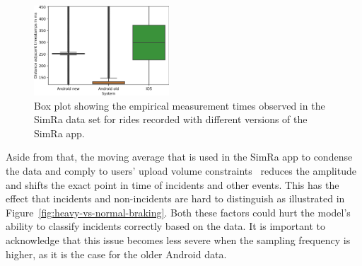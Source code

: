\begin{figure}[t]
	\centering
	\includegraphics[width=0.45\textwidth]{fig/empirical_measurements.png}
	\caption{Box plot showing the empirical measurement times observed in the SimRa data set for rides recorded with different versions of the SimRa app.}
	\label{fig:emp-measurements}
\end{figure}

Aside from that, the moving average that is used in the SimRa app to condense the data and comply to users' upload volume constraints~\cite{karakaya2020simra} reduces the amplitude and shifts the exact point in time of incidents and other events.
This has the effect that incidents and non-incidents are hard to distinguish as illustrated in Figure~\ref{fig:heavy-vs-normal-braking}.
Both these factors could hurt the model's ability to classify incidents correctly based on the data.
It is important to acknowledge that this issue becomes less severe when the sampling frequency is higher, as it is the case for the older Android data.


